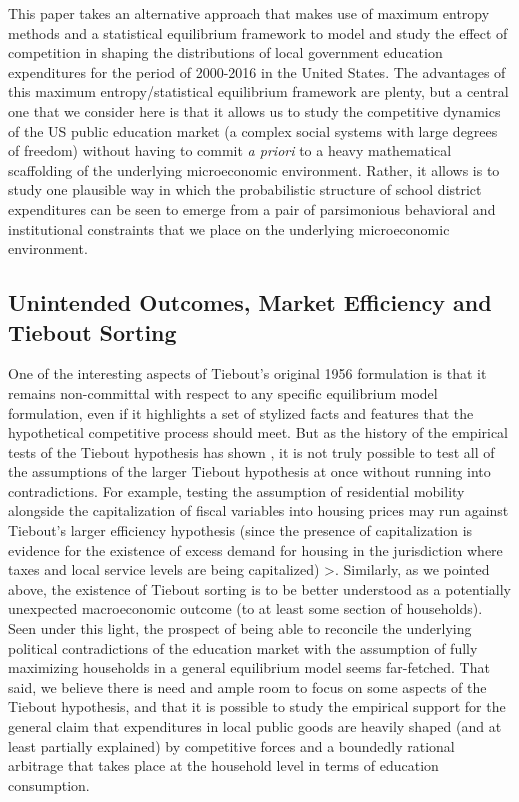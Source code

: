 This paper takes an alternative approach that makes use of maximum
entropy methods and a statistical equilibrium framework to model and
study the effect of competition in shaping the distributions of local
government education expenditures for the period of 2000-2016 in the
United States. The advantages of this maximum entropy/statistical
equilibrium framework are plenty, but a central one that we consider
here is that it allows us to study the competitive dynamics of the US
public education market (a complex social systems with large degrees
of freedom) without having to commit \emph{a priori} to a heavy
mathematical scaffolding of the underlying microeconomic
environment. Rather, it allows is to study one plausible way in which
the probabilistic structure of school district expenditures can be
seen to emerge from a pair of parsimonious behavioral and institutional
constraints that we place on the underlying microeconomic environment.

\subsection{Unintended Outcomes, Market Efficiency and Tiebout Sorting}
\label{sec-1-2}

One of the interesting aspects of Tiebout's original 1956 formulation
is that it remains non-committal with respect to any specific
equilibrium model formulation, even if it highlights a set of stylized
facts and features that the hypothetical competitive process should
meet. But as the history of the empirical tests of the Tiebout
hypothesis has shown
\citep{nechyba_tiebout_2020,oates_effects_1969,edel_taxes_1974},
it is not truly possible to test all of the assumptions of the larger
Tiebout hypothesis at once without running into contradictions. For
example, testing the assumption of residential mobility alongside the
capitalization of fiscal variables into housing prices may run against
Tiebout's larger efficiency hypothesis (since the presence of
capitalization is evidence for the existence of excess demand for
housing in the jurisdiction where taxes and local service levels are
being capitalized) \citep{epple_fiscal_2004}>. Similarly, as we
pointed above, the existence of Tiebout sorting is to be better
understood as a potentially unexpected macroeconomic outcome (to at
least some section of households).  Seen under this light, the
prospect of being able to reconcile the underlying political
contradictions of the education market with the assumption of fully
maximizing households in a general equilibrium model seems
far-fetched. That said, we believe there is need and ample room to
focus on some aspects of the Tiebout hypothesis, and that it is
possible to study the empirical support for the general claim that
expenditures in local public goods are heavily shaped (and at least
partially explained) by competitive forces and a boundedly rational
arbitrage that takes place at the household level in terms of
education consumption.

